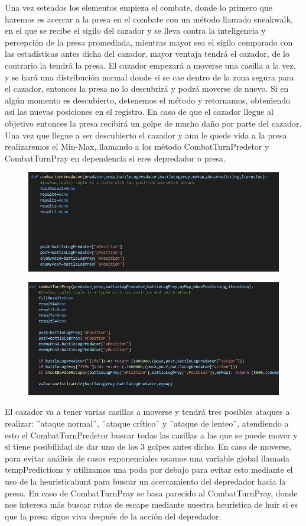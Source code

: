 \documentclass{llncs}
\begin{document}
Una vez seteados los elementos empieza el combate, donde lo primero que haremos es acercar a la presa en el combate con un método llamado sneakwalk, en el que se recibe el sigilo del cazador y se lleva contra la inteligencia y percepción de la presa promediada, mientras mayor sea el sigilo comparado con las estadísticas antes dicha del cazador, mayor ventaja tendrá el cazador, de lo contrario la tendrá la presa.
\newline
\newline
El cazador empezará a moverse una casilla a la vez, y se hará una distribución normal donde si se cae dentro de la zona segura para el cazador, entonces la presa no lo descubrirá y podrá moverse de nuevo. Si en algún momento es descubierto, detenemos el método y retornamos, obteniendo así las nuevas posiciones en el registro. En caso de que el cazador llegue al objetivo entonces la presa recibirá un golpe de mucho daño por parte del cazador.
\newline
\newline
Una vez que llegue a ser descubierto el cazador y aun le quede vida a la presa realizaremos el Min-Max, llamando a los método CombatTurnPredetor y CombatTurnPray en dependencia si eres depredador o presa.

\begin{figure}
	\centering
	\includegraphics[width=0.5\linewidth]{imagenesMisc/CombatTurnPredator}
	\label{fig:combatturnpredator}
\end{figure}
\begin{figure}
	\centering
	\includegraphics[width=0.5\linewidth]{imagenesMisc/CombatTurnPray}
	\label{fig:combatturnpray}
\end{figure}


El cazador va a tener varias casillas a moverse y tendrá tres posibles ataques a realizar: ¨ataque normal¨, ¨ataque crítico¨ y ¨ataque de lenteo¨, atendiendo a esto el CombatTurnPredetor buscar todas las casillas a las que se puede mover y si tiene posibilidad de dar uno de los 3 golpes antes dicho. En caso de moverse, para evitar análisis de casos exponenciales usamos una variable global llamada tempPredictions y utilizamos una poda por debajo para evitar esto mediante el uso de la heuristicahunt para buscar un acercamiento del depredador hacia la presa.
\newline
\newline
En caso de CombatTurnPray se basa parecido al CombatTurnPray, donde nos interesa más buscar rutas de escape mediante nuestra heuristica de huir si es que la presa sigue viva después de la acción del depredador.
\end{document}
